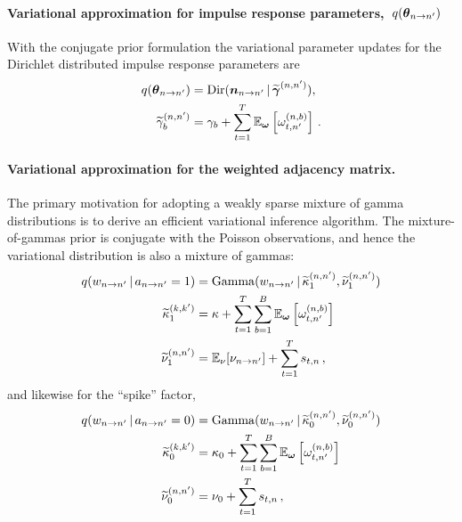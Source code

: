 \paragraph{Variational approximation for impulse response parameters,~$q(\boldsymbol{\theta}_{n \to n'})$}
With the conjugate prior formulation the variational parameter updates
for the Dirichlet distributed impulse response parameters are
\begin{align*}
q(\boldsymbol{\theta}_{n \to n'}) &= \mathrm{Dir}(\boldsymbol{n}_{n \to n'} \,|\, \widetilde{\boldsymbol{\gamma}}^{(n,n')}), \\
\widetilde{\gamma}_b^{(n,n')} &= \gamma_{b} + \sum_{t=1}^T \mathbb{E}_{\boldsymbol{\omega}}\left[\omega_{t,n'}^{(n,b)}\right]\,.
\end{align*}

\paragraph{Variational approximation for the weighted adjacency matrix.}
The primary motivation for adopting a weakly sparse mixture of gamma
distributions is to derive an efficient variational inference
algorithm.  The mixture-of-gammas prior is conjugate with the Poisson
observations, and hence the variational distribution is also a mixture
of gammas:
\begin{align*}
  q(w_{n \to n'} \,|\, a_{n \to n'}=1)
  &= \mathrm{Gamma}(w_{n \to n'} \,|\,
  \widetilde{\kappa}^{(n,n')}_1,
  \widetilde{\nu}^{(n,n')}_1) \\
  \widetilde{\kappa}^{(k,k')}_1
  &= \kappa + \sum_{t=1}^T \sum_{b=1}^B \mathbb{E}_{\boldsymbol{\omega}}\left[\omega_{t,n'}^{(n,b)}\right] \\
  \widetilde{\nu}^{(n,n')}_1
  &= \mathbb{E}_{\nu}[\nu_{n \to n'}] + \sum_{t=1}^T s_{t,n}\,,
\end{align*}
and likewise for the ``spike'' factor,
\begin{align*}
  q(w_{n \to n'} \,|\, a_{n \to n'}=0)
  &= \mathrm{Gamma}(w_{n \to n'} \,|\,
  \widetilde{\kappa}^{(n,n')}_0,
  \widetilde{\nu}^{(n,n')}_0) \\
  \widetilde{\kappa}^{(k,k')}_0
  &= \kappa_0 + \sum_{t=1}^T \sum_{b=1}^B \mathbb{E}_{\boldsymbol{\omega}}\left[\omega_{t,n'}^{(n,b)}\right] \\
  \widetilde{\nu}^{(n,n')}_0
  &= \nu_0 + \sum_{t=1}^T s_{t,n}\,,
\end{align*}

